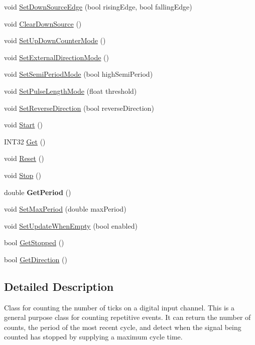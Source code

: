 \begin{DoxyCompactItemize}
\item 
void \hyperlink{classCounter_a929a270422ce7fe72955f76e33e60fd2}{SetDownSourceEdge} (bool risingEdge, bool fallingEdge)
\item 
void \hyperlink{classCounter_a14f57c89d5e20d5ca590877dcc6be50f}{ClearDownSource} ()
\item 
void \hyperlink{classCounter_aa71cea0b77f6664454f0f56a665b00c4}{SetUpDownCounterMode} ()
\item 
void \hyperlink{classCounter_a750cad2fc33948da6a8f595bfdd126c8}{SetExternalDirectionMode} ()
\item 
void \hyperlink{classCounter_a1047b8a9c109942ecbbeaa66a1ba1842}{SetSemiPeriodMode} (bool highSemiPeriod)
\item 
void \hyperlink{classCounter_adc8d4c41b26c8654fe3775afdb6439f5}{SetPulseLengthMode} (float threshold)
\item 
void \hyperlink{classCounter_ab9f8c0a4b5491767c48262a5471992cd}{SetReverseDirection} (bool reverseDirection)
\item 
void \hyperlink{classCounter_a0766c0a11e84866758b20b29e2e17cc0}{Start} ()
\item 
INT32 \hyperlink{classCounter_ad8b0c5e46e0360f93554530d90d553b8}{Get} ()
\item 
void \hyperlink{classCounter_a006032d39fada9ad683ccc849d2f60d3}{Reset} ()
\item 
void \hyperlink{classCounter_aa6ea006a3109769cc1e0a37dc25e11f4}{Stop} ()
\item 
\hypertarget{classCounter_a51030989a5ee306beaf40ac28ab362c0}{
double {\bfseries GetPeriod} ()}
\label{classCounter_a51030989a5ee306beaf40ac28ab362c0}

\item 
void \hyperlink{classCounter_a8496d29a6b9424f76075396e9c729bca}{SetMaxPeriod} (double maxPeriod)
\item 
void \hyperlink{classCounter_a6701899f12600eabff3345223d65d4db}{SetUpdateWhenEmpty} (bool enabled)
\item 
bool \hyperlink{classCounter_ae6bea5b908b1c276e8592e18656aaf21}{GetStopped} ()
\item 
bool \hyperlink{classCounter_acdfa2215fb973249a5f0d2a9f2f3c6b6}{GetDirection} ()
\end{DoxyCompactItemize}


\subsection{Detailed Description}
Class for counting the number of ticks on a digital input channel. This is a general purpose class for counting repetitive events. It can return the number of counts, the period of the most recent cycle, and detect when the signal being counted has stopped by supplying a maximum cycle time. 

